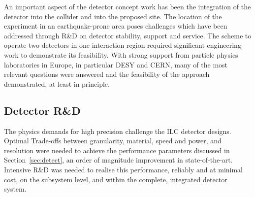 \documentclass[%
 reprint,
 amsmath,amssymb,
 aps,
]{revtex4-1}
\newcommand{\todo}[1]{\textcolor{red}{{#1}}}
\begin{document}
An important aspect of the detector concept work has been
the integration of the detector into the collider and into the
proposed site. The location of the experiment in an earthquake-prone
area poses challenges which have been addressed through R\&D on
detector stability, support and service. The scheme to operate two
detectors in one interaction region required
significant engineering work to demonstrate its
feasibility. With strong support from particle physics laboratories in
Europe, in  particular DESY and CERN, many of the most relevant
questions were answered and the feasibility
 of the approach demonstrated, at least in principle. 


\vspace{-.4cm}


\subsection{\label{sec:detectrd} Detector R\&D}

\vspace{-.3cm}



The physics demands for high precision challenge
the ILC detector designs.  Optimal 
Trade-offs between
granularity, material, speed and power, and 
resolution were needed to achieve
the performance parameters  discussed
in Section~\ref{sec:detect},
an order of magnitude
improvement in state-of-the-art.
Intensive R\&D was needed to realise this performance,
reliably and at minimal cost,
on the subsystem level, and  within the complete,
integrated detector system.\cite{RDliaision}
\end{document}
